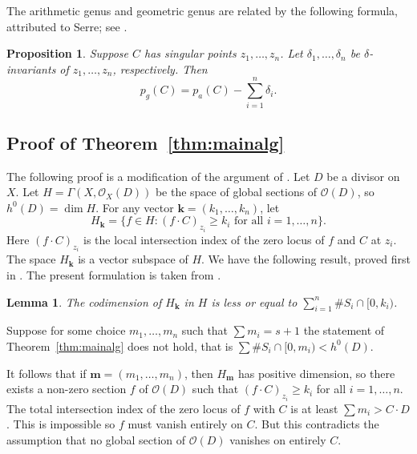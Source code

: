 \documentclass[11pt]{amsart}
\numberwithin{equation}{section}
\theoremstyle{plain}
\newtheorem{lemma}[equation]{Lemma}
\newtheorem{proposition}[equation]{Proposition}
\theoremstyle{definition}
\begin{document}
The arithmetic genus and geometric genus are related by the following formula, attributed to Serre; see \cite[Section II.11]{BH}.
\begin{proposition}\label{prop:genusserre}
Suppose $C$ has singular points $z_1,\ldots,z_n$. Let $\delta_1,\ldots,\delta_n$ be $\delta$-invariants of $z_1,\ldots,z_n$, respectively.
Then
\[p_g(C)=p_a(C)-\sum_{i=1}^n\delta_i.\]
\end{proposition}
\subsection{Proof of Theorem~\ref{thm:mainalg}}
The following proof is a modification of the argument of \cite[Proposition 2]{FLMN}.
Let $D$ be a divisor on $X$. Let $H=\Gamma(X,\mathcal{O}_X(D))$
be the space of global sections of $\mathcal{O}(D)$, so $h^0(D)=\dim H$. For any vector ${\mathbf{k}}=(k_1,\ldots,k_n)$, let 
\[H_{\mathbf{k}}=\{f\in H\colon (f\cdot C)_{z_i}\ge k_i\textrm{ for all } i=1,\ldots,n\}.\]
Here $(f\cdot C)_{z_i}$ is the local intersection index of the zero locus of  $f$ and $C$ at $z_i$.
The space $H_{\mathbf{k}}$ is a vector subspace of $H$. We have the following result, proved first in \cite{FLMN}. The
present formulation is taken from \cite[Lemma 3.17]{BM}.
\begin{lemma}\label{lem:codim}
The codimension of $H_{\mathbf{k}}$ in $H$ is less or equal to $\sum_{i=1}^n \# S_i\cap[0,k_i)$.
\end{lemma}
Suppose for some choice $m_1,\ldots,m_n$ such that $\sum m_i=s+1$ the statement of Theorem~\ref{thm:mainalg}
does not hold, that is $\sum\# S_i\cap[0,m_i)<h^0(D)$.

It follows that if ${\mathbf{m}}=(m_1,\ldots,m_n)$, then $H_{\mathbf{m}}$ has positive dimension, so there
exists a non-zero section $f$ of $\mathcal{O}(D)$ such that $(f\cdot C)_{z_i}\ge k_i$ for all $i=1,\ldots,n$. 
The total intersection index of the zero locus of $f$ 
with $C$ is at least $\sum m_i>C\cdot D$.
This is impossible so $f$ must vanish entirely on $C$. But this
contradicts the assumption that no global section of $\mathcal{O}(D)$ vanishes on entirely $C$.
\end{document}
